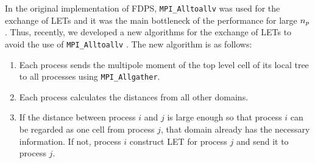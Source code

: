 \documentclass[dvipdfmx]{pasj01}
\begin{document}

In the original implementation of FDPS, {\tt MPI\_Alltoallv} was used
for the exchange of LETs and it was the main bottleneck of the
performance for large $n_{\rm p}$ \citep{Iwasawaetal2016}. Thus,
recently, we developed a new algorithms for the exchange of LETs to
avoid the use of {\tt MPI\_Alltoallv} \citep{Iwasawaetal2018}. The new
algorithm is as follows:
\begin{enumerate}
\item Each process sends the multipole moment of the top level cell of
  its local tree to all processes using {\tt MPI\_Allgather}.
\item Each process calculates the distances from all other domains.
\item If the distance between process $i$ and $j$ is large enough so
  that process $i$ can be regarded as one cell from process $j$, that
  domain already has the necessary information. If not, process $i$
  construct LET for process $j$ and send it to process $j$. 
\end{enumerate}
\end{document}

